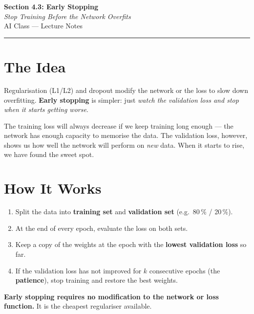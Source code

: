 \documentclass[12pt, a4paper]{article}
\newif\ifstudentmode
\theoremstyle{definition}
\begin{document}
\begin{center}
  {\LARGE \textbf{Section 4.3: Early Stopping}} \\[0.3em]
  {\large\itshape Stop Training Before the Network Overfits} \\[0.5em]
  {\large AI Class --- Lecture Notes}%
  \ifstudentmode\quad{\normalsize\color{gray}[Student Copy]}\fi
\end{center}

\vspace{1em}\hrule\vspace{1.5em}

\section{The Idea}

Regularisation (L1/L2) and dropout modify the network or the loss to slow
down overfitting.  \textbf{Early stopping} is simpler: just
\emph{watch the validation loss and stop when it starts getting worse}.

The training loss will always decrease if we keep training long enough ---
the network has enough capacity to memorise the data.
The validation loss, however, shows us how well the network will perform on
\emph{new} data.  When it starts to rise, we have found the sweet spot.

\section{How It Works}

\begin{enumerate}
  \item Split the data into \textbf{training set} and \textbf{validation set}
        (e.g.\ 80\,\% / 20\,\%).
  \item At the end of every epoch, evaluate the loss on both sets.
  \item Keep a copy of the weights at the epoch with the
        \textbf{lowest validation loss} so far.
  \item If the validation loss has not improved for $k$ consecutive epochs
        (the \textbf{patience}), stop training and restore the best weights.
\end{enumerate}

\begin{resultbox}
\textbf{Early stopping requires no modification to the network or loss
function.}
It is the cheapest regulariser available.
\end{resultbox}
\end{document}
